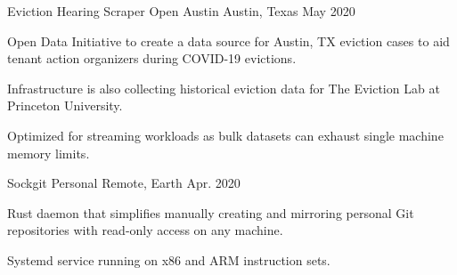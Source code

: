 
\begin{cventries}
	
	\cventry
		{Eviction Hearing Scraper} %
		{Open Austin} %
		{Austin, Texas} %
		{May 2020} %
		{
			\begin{cvitems} %
				\item {Open Data Initiative to create a data source for Austin, TX eviction cases to aid tenant action organizers during COVID-19 evictions.}
				\item {Infrastructure is also collecting historical eviction data for The Eviction Lab at Princeton University.}
				\item {Optimized for streaming workloads as bulk datasets can exhaust single machine memory limits.}
			\end{cvitems}
		}


	\cventry
		{Sockgit} %
		{Personal} %
		{Remote, Earth} %
		{Apr. 2020} %
		{
			\begin{cvitems} %
				\item {Rust daemon that simplifies manually creating and mirroring personal Git repositories with read-only access on any machine.}
				\item {Systemd service running on x86 and ARM instruction sets.}
			\end{cvitems}
		}


\end{cventries}
